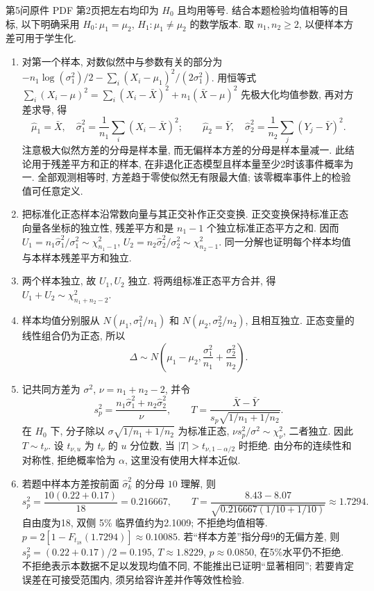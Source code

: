 \begin{solution}
第5问原件 PDF 第2页把左右均印为 $H_0$ 且均用等号. 结合本题检验均值相等的目标, 以下明确采用 $H_0:\mu_1=\mu_2$, $H_1:\mu_1\ne\mu_2$ 的数学版本. 取 $n_1,n_2\ge2$, 以便样本方差可用于学生化.
\begin{enumerate}[label=\arabic*.]
\item 对第一个样本, 对数似然中与参数有关的部分为 $-n_1\log(\sigma_1^2)/2-\sum_i(X_i-\mu_1)^2/(2\sigma_1^2)$. 用恒等式
$\sum_i(X_i-\mu)^2=\sum_i(X_i-\bar X)^2+n_1(\bar X-\mu)^2$
先极大化均值参数, 再对方差求导, 得
\[
\hat\mu_1=\bar X,\quad \hat\sigma_1^2=\frac1{n_1}\sum_i(X_i-\bar X)^2;
\qquad
\hat\mu_2=\bar Y,\quad \hat\sigma_2^2=\frac1{n_2}\sum_j(Y_j-\bar Y)^2.
\]
注意极大似然方差的分母是样本量, 而无偏样本方差的分母是样本量减一. 此结论用于残差平方和正的样本, 在非退化正态模型且样本量至少2时该事件概率为一. 全部观测相等时, 方差趋于零使似然无有限最大值; 该零概率事件上的检验值可任意定义.
\item 把标准化正态样本沿常数向量与其正交补作正交变换. 正交变换保持标准正态向量各坐标的独立性, 残差平方和是 $n_1-1$ 个独立标准正态平方之和. 因而
$U_1=n_1\hat\sigma_1^2/\sigma_1^2\sim\chi^2_{n_1-1}$,
$U_2=n_2\hat\sigma_2^2/\sigma_2^2\sim\chi^2_{n_2-1}$.
同一分解也证明每个样本均值与本样本残差平方和独立.
\item 两个样本独立, 故 $U_1,U_2$ 独立. 将两组标准正态平方合并, 得 $U_1+U_2\sim\chi^2_{n_1+n_2-2}$.
\item 样本均值分别服从 $N(\mu_1,\sigma_1^2/n_1)$ 和 $N(\mu_2,\sigma_2^2/n_2)$, 且相互独立. 正态变量的线性组合仍为正态, 所以
\[
\Delta\sim N\left(\mu_1-\mu_2,\frac{\sigma_1^2}{n_1}+\frac{\sigma_2^2}{n_2}\right).
\]
\item 记共同方差为 $\sigma^2$, $\nu=n_1+n_2-2$, 并令
\[
s_p^2=\frac{n_1\hat\sigma_1^2+n_2\hat\sigma_2^2}{\nu},\qquad
T=\frac{\bar X-\bar Y}{s_p\sqrt{1/n_1+1/n_2}}.
\]
在 $H_0$ 下, 分子除以 $\sigma\sqrt{1/n_1+1/n_2}$ 为标准正态, $\nu s_p^2/\sigma^2\sim\chi^2_\nu$, 二者独立. 因此 $T\sim t_\nu$. 设 $t_{\nu,u}$ 为 $t_\nu$ 的 $u$ 分位数, 当 $|T|>t_{\nu,1-\alpha/2}$ 时拒绝. 由分布的连续性和对称性, 拒绝概率恰为 $\alpha$, 这里没有使用大样本近似.
\item 若题中样本方差按前面 $\hat\sigma_k^2$ 的分母 $10$ 理解, 则
\[
s_p^2=\frac{10(0.22+0.17)}{18}=0.216667,\qquad
T=\frac{8.43-8.07}{\sqrt{0.216667(1/10+1/10)}}\approx1.7294.
\]
自由度为18, 双侧 5\% 临界值约为2.1009; 不拒绝均值相等. $p=2[1-F_{t_{18}}(1.7294)]\approx0.10085$.
若“样本方差”指分母9的无偏方差, 则 $s_p^2=(0.22+0.17)/2=0.195$, $T\approx1.8229$, $p\approx0.0850$, 在5\%水平仍不拒绝. 不拒绝表示本数据不足以发现均值不同, 不能推出已证明“显著相同”; 若要肯定误差在可接受范围内, 须另给容许差并作等效性检验.
\end{enumerate}
\end{solution}

